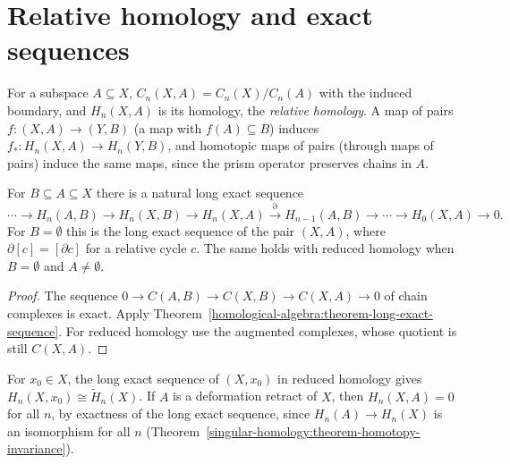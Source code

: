 \section{Relative homology and exact sequences}\label{singular-homology:section-relative}

\begin{definition}\label{singular-homology:definition-relative}
For a subspace $A \subseteq X$, $C_n(X, A) = C_n(X)/C_n(A)$ with the induced boundary, and $H_n(X, A)$ is its homology, the \emph{relative homology}. A
map of pairs $f \colon (X, A) \to (Y, B)$ (a map with $f(A) \subseteq B$) induces $f_* \colon H_n(X, A) \to H_n(Y, B)$, and homotopic maps of pairs (through
maps of pairs) induce the same maps, since the prism operator preserves chains in $A$.
\end{definition}

\begin{theorem}\label{singular-homology:theorem-long-exact-sequence}
For $B \subseteq A \subseteq X$ there is a natural long exact sequence
\[
\cdots \to H_n(A, B) \to H_n(X, B) \to H_n(X, A) \xrightarrow{\partial} H_{n-1}(A, B) \to \cdots \to H_0(X, A) \to 0.
\]
For $B = \emptyset$ this is the long exact sequence of the pair $(X, A)$, where $\partial[c] = [\partial c]$ for a relative cycle $c$. The same holds with
reduced homology when $B = \emptyset$ and $A \neq \emptyset$.
\end{theorem}

\begin{proof}
The sequence $0 \to C(A, B) \to C(X, B) \to C(X, A) \to 0$ of chain complexes is exact. Apply Theorem~\ref{homological-algebra:theorem-long-exact-sequence}. For
reduced homology use the augmented complexes, whose quotient is still $C(X, A)$.
\end{proof}

\begin{example}\label{singular-homology:example-pair-point}
For $x_0 \in X$, the long exact sequence of $(X, x_0)$ in reduced homology gives $H_n(X, x_0) \cong \tilde{H}_n(X)$. If $A$ is a deformation retract of $X$,
then $H_n(X, A) = 0$ for all $n$, by exactness of the long exact sequence, since $H_n(A) \to H_n(X)$ is an isomorphism for all $n$
(Theorem~\ref{singular-homology:theorem-homotopy-invariance}).
\end{example}

